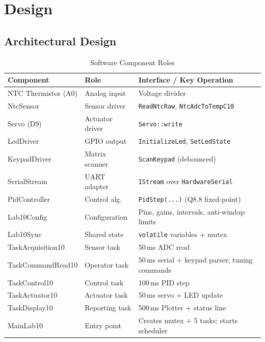 \documentclass[12pt]{article}
\begin{document}
\section{Design}

\subsection{Architectural Design}

\begin{table}[H]
\centering
\begin{tabular}{@{}p{3.6cm}p{2.8cm}p{6.0cm}@{}}
\toprule
\textbf{Component} & \textbf{Role} & \textbf{Interface / Key Operation} \\
\midrule
NTC Thermistor (A0) & Analog input    & Voltage divider \\
NtcSensor          & Sensor driver   & \texttt{ReadNtcRaw}, \texttt{NtcAdcToTempC10} \\
Servo (D9)         & Actuator driver & \texttt{Servo::write} \\
LedDriver          & GPIO output     & \texttt{InitializeLed}, \texttt{SetLedState} \\
KeypadDriver       & Matrix scanner  & \texttt{ScanKeypad} (debounced) \\
SerialStream       & UART adapter    & \texttt{IStream} over \texttt{HardwareSerial} \\
PidController      & Control alg.    & \texttt{PidStep(...)} (Q8.8 fixed-point) \\
Lab10Config        & Configuration   & Pins, gains, intervals, anti-windup limits \\
Lab10Sync          & Shared state    & \texttt{volatile} variables + mutex \\
TaskAcquisition10  & Sensor task     & 50\,ms ADC read \\
TaskCommandRead10  & Operator task   & 50\,ms serial + keypad parser; tuning commands \\
TaskControl10      & Control task    & 100\,ms PID step \\
TaskActuator10     & Actuator task   & 50\,ms servo + LED update \\
TaskDisplay10      & Reporting task  & 500\,ms Plotter + status line \\
MainLab10          & Entry point     & Creates mutex + 5 tasks; starts scheduler \\
\bottomrule
\end{tabular}
\caption{Software Component Roles}
\label{tab:components}
\end{table}
\end{document}
